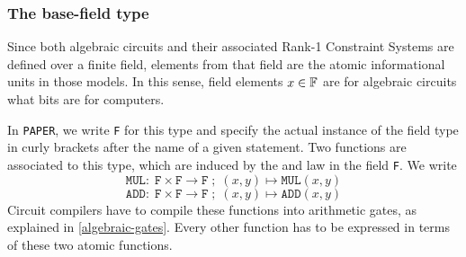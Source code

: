 \subsubsection{The base-field type} 
Since both algebraic circuits and their associated Rank-1 Constraint Systems are defined over a finite field, elements from that field are the atomic informational units in those models. In this sense, field elements $x\in \mathbb{F}$ are for algebraic circuits what bits are for computers. 

In \texttt{PAPER}, we write \texttt{F} for this type and specify the actual instance of the field type in curly brackets after the name of a given statement. Two functions are associated to this type, which are induced by the  and  law in the field \texttt{F}. We write
\begin{equation}
\mathtt{MUL}:\; \mathtt{F} \times \mathtt{F} \to \mathtt{F}\;;\; (x,y) \mapsto \mathtt{MUL}(x,y)
\end{equation}
\begin{equation}
\mathtt{ADD}:\; \mathtt{F} \times \mathtt{F} \to \mathtt{F}\;;\; (x,y) \mapsto \mathtt{ADD}(x,y)
\end{equation}
Circuit compilers have to compile these functions into arithmetic gates, as explained in \ref{algebraic-gates}. Every other function has to be expressed in terms of these two atomic functions.

